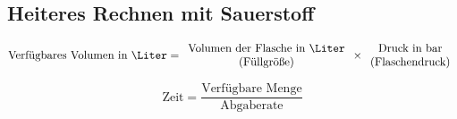 \documentclass[
ngerman,
paper=a4,
asymmetric,
fontsize=8pt,
draft=false,
numbers=noenddot,
bibtotocnumbered,
footnotes=multiple,
toc=flat,
]{scrbook}
\begin{document}
\bigskip


\subsection{Heiteres Rechnen mit Sauerstoff}
% 

{\FontSansNarrowFamily
\begin{equation}
\text{Verfügbares Volumen in \Liter} = {\begin{array}{c}
\text{Volumen der Flasche in \Liter}\\
\text{(Füllgröße)} \end{array}}
\times 
\begin{array}{c}{\text{Druck in bar}}\\
\text{(Flaschendruck)}
\end{array}
\end{equation}

\begin{equation}
\text{Zeit} = \frac{\text{Verfügbare
Menge}}{\text{Abgaberate}}
\end{equation}
}
% 








\end{document}
